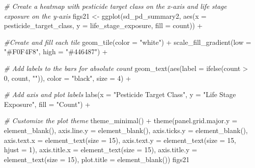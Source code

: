 \documentclass[
]{article}
\newenvironment{Shaded}{\begin{snugshade}}{\end{snugshade}}
\newcommand{\AttributeTok}[1]{\textcolor[rgb]{0.77,0.63,0.00}{#1}}
\newcommand{\CommentTok}[1]{\textcolor[rgb]{0.56,0.35,0.01}{\textit{#1}}}
\newcommand{\DecValTok}[1]{\textcolor[rgb]{0.00,0.00,0.81}{#1}}
\newcommand{\FunctionTok}[1]{\textcolor[rgb]{0.00,0.00,0.00}{#1}}
\newcommand{\NormalTok}[1]{#1}
\newcommand{\OtherTok}[1]{\textcolor[rgb]{0.56,0.35,0.01}{#1}}
\newcommand{\SpecialCharTok}[1]{\textcolor[rgb]{0.00,0.00,0.00}{#1}}
\newcommand{\StringTok}[1]{\textcolor[rgb]{0.31,0.60,0.02}{#1}}
\begin{document}
\begin{Shaded}
\begin{Highlighting}[]
\CommentTok{\# Create a heatmap with pesticide target class on the x{-}axis and life stage exposure on the y{-}axis}
\NormalTok{figs21 }\OtherTok{\textless{}{-}} \FunctionTok{ggplot}\NormalTok{(sd\_pd\_summary2, }\FunctionTok{aes}\NormalTok{(}\AttributeTok{x =}\NormalTok{ pesticide\_target\_class, }\AttributeTok{y =}\NormalTok{ life\_stage\_exposure, }\AttributeTok{fill =}\NormalTok{ count)) }\SpecialCharTok{+}
  
  \CommentTok{\#Create and fill each tile}
  \FunctionTok{geom\_tile}\NormalTok{(}\AttributeTok{color =} \StringTok{"white"}\NormalTok{) }\SpecialCharTok{+}
  \FunctionTok{scale\_fill\_gradient}\NormalTok{(}\AttributeTok{low =} \StringTok{"\#F0F4F8"}\NormalTok{, }\AttributeTok{high =} \StringTok{"\#446487"}\NormalTok{) }\SpecialCharTok{+}
  
  \CommentTok{\# Add labels to the bars for absolute count }
  \FunctionTok{geom\_text}\NormalTok{(}\FunctionTok{aes}\NormalTok{(}\AttributeTok{label =} \FunctionTok{ifelse}\NormalTok{(count }\SpecialCharTok{\textgreater{}} \DecValTok{0}\NormalTok{, count, }\StringTok{""}\NormalTok{)), }\AttributeTok{color =} \StringTok{"black"}\NormalTok{, }\AttributeTok{size =} \DecValTok{4}\NormalTok{) }\SpecialCharTok{+}
  
  \CommentTok{\# Add axis and plot labels}
  \FunctionTok{labs}\NormalTok{(}\AttributeTok{x =} \StringTok{"Pesticide Target Class"}\NormalTok{, }\AttributeTok{y =} \StringTok{"Life Stage Exposure"}\NormalTok{, }\AttributeTok{fill =} \StringTok{"Count"}\NormalTok{) }\SpecialCharTok{+}
  
  \CommentTok{\# Customize the plot theme}
  \FunctionTok{theme\_minimal}\NormalTok{() }\SpecialCharTok{+}
  \FunctionTok{theme}\NormalTok{(}\AttributeTok{panel.grid.major.y =} \FunctionTok{element\_blank}\NormalTok{(),}
    \AttributeTok{axis.line.y =} \FunctionTok{element\_blank}\NormalTok{(),}
    \AttributeTok{axis.ticks.y =} \FunctionTok{element\_blank}\NormalTok{(),}
    \AttributeTok{axis.text.x =} \FunctionTok{element\_text}\NormalTok{(}\AttributeTok{size =} \DecValTok{15}\NormalTok{),}
    \AttributeTok{axis.text.y =} \FunctionTok{element\_text}\NormalTok{(}\AttributeTok{size =} \DecValTok{15}\NormalTok{, }\AttributeTok{hjust =} \DecValTok{1}\NormalTok{),}
    \AttributeTok{axis.title.x =} \FunctionTok{element\_text}\NormalTok{(}\AttributeTok{size =} \DecValTok{15}\NormalTok{),}
    \AttributeTok{axis.title.y =} \FunctionTok{element\_text}\NormalTok{(}\AttributeTok{size =} \DecValTok{15}\NormalTok{),}
    \AttributeTok{plot.title =} \FunctionTok{element\_blank}\NormalTok{())}
\NormalTok{figs21                                     }
\end{Highlighting}
\end{Shaded}
\end{document}
